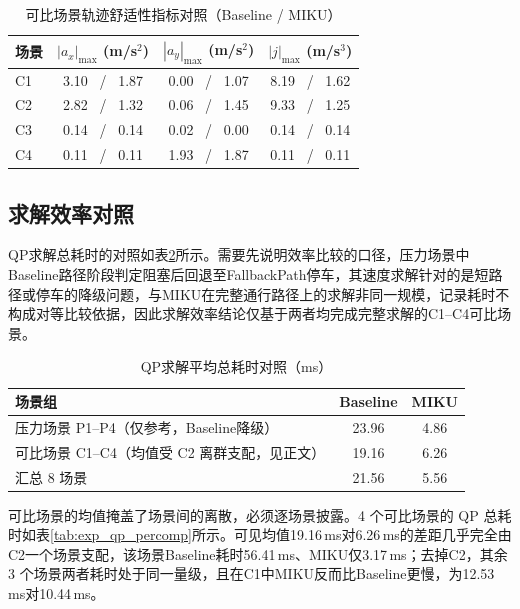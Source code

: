 \documentclass[a4paper,zihao=5]{ctexart}
\theoremstyle{definition}
\begin{document}
\begin{table}[htbp]
\centering
\caption{可比场景轨迹舒适性指标对照（Baseline / MIKU）}
\label{tab:exp_comfort}
\small
\begin{tabular}{lccc}
\toprule
\textbf{场景} & \textbf{$|a_x|_{\max}$ (m/s$^2$)} & \textbf{$|a_y|_{\max}$ (m/s$^2$)} & \textbf{$|j|_{\max}$ (m/s$^3$)} \\
\midrule
C1 & 3.10 \ / \ 1.87 & 0.00 \ / \ 1.07 & 8.19 \ / \ 1.62 \\
C2 & 2.82 \ / \ 1.32 & 0.06 \ / \ 1.45 & 9.33 \ / \ 1.25 \\
C3 & 0.14 \ / \ 0.14 & 0.02 \ / \ 0.00 & 0.14 \ / \ 0.14 \\
C4 & 0.11 \ / \ 0.11 & 1.93 \ / \ 1.87 & 0.11 \ / \ 0.11 \\
\bottomrule
\end{tabular}
\end{table}

\subsection{求解效率对照}
\label{subsec:exp_qp}

QP求解总耗时的对照如表\ref{tab:exp_qp}所示。需要先说明效率比较的口径，压力场景中Baseline路径阶段判定阻塞后回退至FallbackPath停车，其速度求解针对的是短路径或停车的降级问题，与MIKU在完整通行路径上的求解非同一规模，记录耗时不构成对等比较依据，因此求解效率结论仅基于两者均完成完整求解的C1--C4可比场景。

\begin{table}[htbp]
\centering
\caption{QP求解平均总耗时对照（ms）}
\label{tab:exp_qp}
\small
\begin{tabular}{lcc}
\toprule
\textbf{场景组} & \textbf{Baseline} & \textbf{MIKU} \\
\midrule
压力场景 P1--P4（仅参考，Baseline降级） & 23.96 & 4.86 \\
可比场景 C1--C4（均值受 C2 离群支配，见正文） & 19.16 & 6.26 \\
\midrule
汇总 8 场景 & 21.56 & 5.56 \\
\bottomrule
\end{tabular}
\end{table}

可比场景的均值掩盖了场景间的离散，必须逐场景披露。4 个可比场景的 QP 总耗时如表\ref{tab:exp_qp_percomp}所示。可见均值19.16\,ms对6.26\,ms的差距几乎完全由C2一个场景支配，该场景Baseline耗时56.41\,ms、MIKU仅3.17\,ms；去掉C2，其余 3 个场景两者耗时处于同一量级，且在C1中MIKU反而比Baseline更慢，为12.53\,ms对10.44\,ms。
\end{document}
